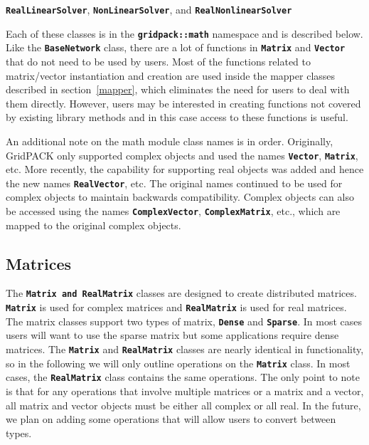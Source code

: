 \texttt{\textbf{RealLinearSolver}}, \texttt{\textbf{NonLinearSolver}}, and \texttt{\textbf{RealNonlinearSolver}}


Each of these classes is in the \texttt{\textbf{gridpack::math}} namespace and
is described below. Like the \texttt{\textbf{BaseNetwork}} class, there are a
lot of functions in \texttt{\textbf{Matrix}} and \texttt{\textbf{Vector}} that
do not need to be used by users. Most of the functions related to matrix/vector
instantiation and creation are used inside the mapper classes described in
section~\ref{mapper}, which eliminates the need for users to deal with them directly. However, users may be interested in creating functions not covered by existing library methods and in this case access to these functions is useful.

An additional note on the math module class names is in order. Originally, GridPACK only supported complex objects and used the names \texttt{\textbf{Vector}}, \texttt{\textbf{Matrix}}, etc. More recently, the capability for supporting real objects was added and hence the new names \texttt{\textbf{RealVector}}, etc. The original names continued to be used for complex objects to maintain backwards compatibility. Complex objects can also be accessed using the names \texttt{\textbf{ComplexVector}}, \texttt{\textbf{ComplexMatrix}}, etc., which are mapped to the original complex objects.

\subsection{Matrices}

The \texttt{\textbf{Matrix and RealMatrix}} classes are designed to create distributed matrices. \texttt{\textbf{Matrix}} is used for complex matrices and \texttt{\textbf{RealMatrix}} is used for real matrices. The matrix classes support two types of matrix, \texttt{\textbf{Dense}} and \texttt{\textbf{Sparse}}. In most cases users will want to use the sparse matrix but some applications require dense matrices. The \texttt{\textbf{Matrix}} and \texttt{\textbf{RealMatrix}} classes are nearly identical in functionality, so in the following we will only outline operations on the \texttt{\textbf{Matrix}} class. In most cases, the \texttt{\textbf{RealMatrix}} class contains the same operations. The only point to note is that for any operations that involve multiple matrices or a matrix and a vector, all matrix and vector objects must be either all complex or all real. In the future, we plan on adding some operations that will allow users to convert between types.

